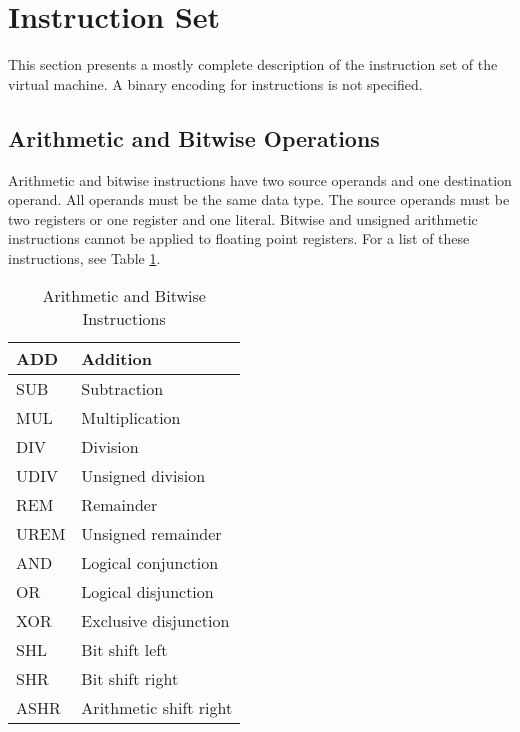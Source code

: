 \section{Instruction Set}

This section presents a mostly complete description
of the instruction set of the virtual machine.
A binary encoding for instructions is not specified.

\subsection{Arithmetic and Bitwise Operations}

Arithmetic and bitwise instructions have two source operands and
one destination operand. All operands must be the same data type.
The source operands must be two registers or one register and one literal.
Bitwise and unsigned arithmetic instructions cannot be applied to
floating point registers. For a list of these instructions,
see Table \ref{ArithmeticAndBitwiseInstructions}.

\begin{table}[h!]
  \begin{center}
    \begin{tabular}{|l|l|}
      \hline
      ADD  & Addition               \\ \hline
      SUB  & Subtraction            \\ \hline
      MUL  & Multiplication         \\ \hline
      DIV  & Division               \\ \hline
      UDIV & Unsigned division      \\ \hline
      REM  & Remainder              \\ \hline
      UREM & Unsigned remainder     \\ \hline
      AND  & Logical conjunction     \\ \hline
      OR   & Logical disjunction    \\ \hline
      XOR  & Exclusive disjunction  \\ \hline
      SHL  & Bit shift left         \\ \hline
      SHR  & Bit shift right        \\ \hline
      ASHR & Arithmetic shift right \\ \hline
    \end{tabular}
  \end{center}
  \caption{Arithmetic and Bitwise Instructions}
  \label{ArithmeticAndBitwiseInstructions}
\end{table}


